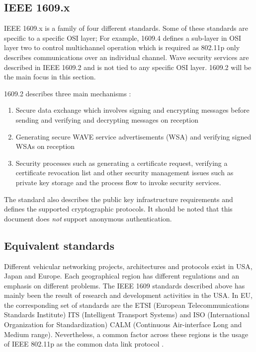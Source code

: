 \subsection{IEEE 1609.x}

IEEE 1609.x is a family of four different standards. Some of these standards are specific to a specific OSI layer; For example, 1609.4 defines a sub-layer in OSI layer two to control multichannel operation which is required as 802.11p only describes communications over an individual channel. Wave security services are described in IEEE 1609.2 and is not tied to any specific OSI layer. 1609.2 will be the main focus in this section.

1609.2 describes three main mechanisms \cite{ieee16092}: 
\begin{enumerate}
	\item Secure data exchange which involves signing and encrypting messages before sending and verifying and decrypting messages on reception
	\item Generating secure WAVE service advertisements (WSA) and verifying signed WSAs on reception
	\item Security processes such as generating a certificate request, verifying a certificate revocation list and other security management issues such as private key storage and the process flow to invoke security services.
\end{enumerate}

The standard also describes the public key infrastructure requirements and defines the supported cryptographic protocols. It should be noted that this document does \textit{not} support anonymous authentication.


\subsection{Equivalent standards}
Different vehicular networking projects, architectures and protocols exist in USA, Japan and Europe. Each geographical region has different regulations and an emphasis on different problems. The IEEE 1609 standards described above has mainly been the result of research and development activities in the USA. In EU, the corresponding set of standards are the ETSI (European Telecommunications Standards Institute) ITS (Intelligent Transport Systems) and ISO (International Organization for Standardization) CALM (Continuous Air-interface Long and Medium range). Nevertheless, a common factor across these regions is the usage of IEEE 802.11p  as the common data link protocol \cite{karagiannis2011vehicular}.

